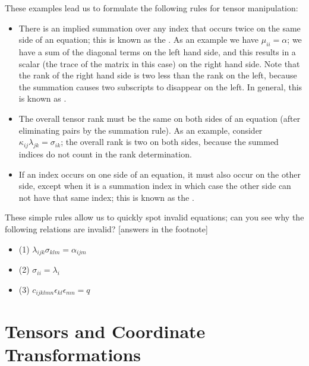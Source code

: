 \noindent These examples lead us to formulate the following rules for tensor manipulation:
\begin{itemize}
	\item There is an implied summation over any index that occurs twice on the same side of an equation; this is known as the .  As an example we have $\mu_{ii}=\alpha$; we have a sum of the diagonal terms on the left hand side, and this results in a scalar (the trace of the matrix in this case) on the right hand side.  Note that the rank of the right hand side is two less than the rank on the left, because the summation causes two subscripts to disappear on the left.  In general, this is known as .
	\item The overall tensor rank must be the same on both sides of an equation (after eliminating pairs by the summation rule).  As an example, consider $\kappa_{ij}\lambda_{jk}=\sigma_{ik}$; the overall rank is two on both sides, because the summed indices do not count in the rank determination.
	\item If an index occurs on one side of an equation, it must also occur on the other side, except when it is a summation index in which case the other side can not have that same index; this is known as the .
\end{itemize}
These simple rules allow us to quickly spot invalid equations; can you see why the following relations are invalid? [answers in the footnote\footnotemark{}]
\begin{itemize}
\item (1) $\lambda_{ijk}\sigma_{klm} = \alpha_{ijm}$
\item (2) $\sigma_{ii} = \lambda_i$ 
\item (3) $c_{ijklmn}\epsilon_{kl}\epsilon_{mn} = q$
\end{itemize}



\newpage
\section{Tensors and Coordinate Transformations}

